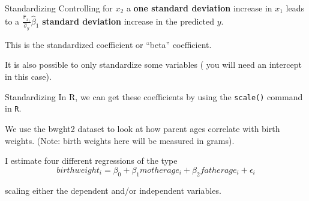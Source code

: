\documentclass[
  ignorenonframetext,
]{beamer}
\begin{document}
\begin{frame}{Standardizing}
\protect\hypertarget{standardizing-4}{}
Controlling for \(x_2\) a \textbf{one standard deviation} increase in
\(x_1\) leads to a
\(\frac{\hat{\sigma}_{x_1}}{\hat{\sigma}_y}\hat{\beta}_1\)
\textbf{standard deviation} increase in the predicted \(y\).

This is the standardized coefficient or ``beta'' coefficient.

It is also possible to only standardize some variables ( you will need
an intercept in this case).
\end{frame}

\begin{frame}[fragile]{Standardizing}
\protect\hypertarget{standardizing-5}{}
In R, we can get these coefficients by using the \texttt{scale()}
command in \texttt{R}.

We use the bwght2 dataset to look at how parent ages correlate with
birth weights. (Note: birth weights here will be measured in grams).

I estimate four different regressions of the type \[
birthweight_i=\beta_0+\beta_1 motherage_i+\beta_2 fatherage_i+\epsilon_i
\]

scaling either the dependent and/or independent variables.
\end{frame}
\end{document}
